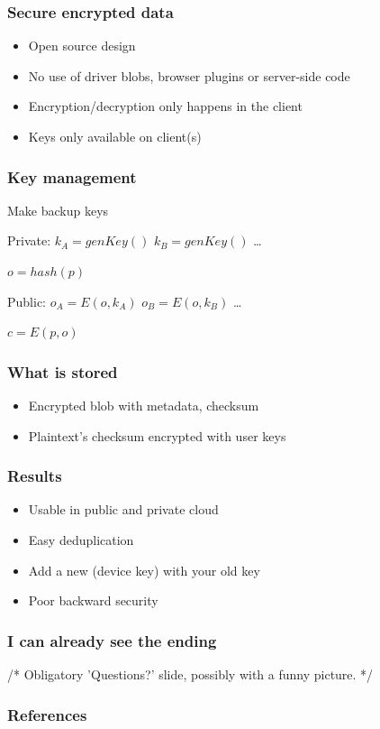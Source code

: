 \documentclass{beamer}
\begin{document}
\begin{frame}
    \frametitle{Secure encrypted data}
    \begin{itemize}
    \item Open source design
    \item No use of driver blobs, browser plugins or server-side code
    \item Encryption/decryption only happens in the client
    \item Keys only available on client(s)
    \end{itemize}
\end{frame}


\begin{frame}
    \frametitle{Key management}
    Make backup keys

    Private:
    $k_A = genKey()$
    $k_B = genKey()$
    \dots

    $o = hash(p)$

    Public:
    $o_A = E(o, k_A)$
    $o_B = E(o, k_B)$
    \dots

    $c = E(p,o)$
\end{frame}

\begin{frame}
    \frametitle{What is stored}
    \begin{itemize}
    \item Encrypted blob with metadata, checksum
    \item Plaintext's checksum encrypted with user keys
    \end{itemize}
\end{frame}

\begin{frame}
    \frametitle{Results}
    \begin{itemize}
    \item Usable in public and private cloud
    \item Easy deduplication
    \item Add a new (device key) with your old key
    \item Poor backward security
    \end{itemize}
\end{frame}

\begin{frame}
    \frametitle{I can already see the ending}
    /* Obligatory 'Questions?' slide, possibly with a funny picture. */
\end{frame}

\begin{frame}
    \frametitle{References}
    
    
\end{frame}
\end{document}
